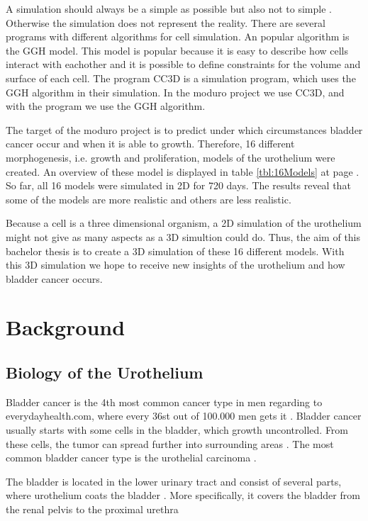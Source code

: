 A simulation should always be a simple as possible but also not to simple \cite{REF}. Otherwise the simulation does not represent the reality. 
There are several programs with different algorithms for cell simulation. An popular algorithm is the \ac{GGH} model. This model is popular because it is easy to describe how cells interact with eachother and it is possible to define constraints for the volume and surface of each cell. \newline
The program \ac{CC3D} is a simulation program, which uses the \ac{GGH} algorithm in their simulation. In the moduro project we use \ac{CC3D}, and with the program we use the \ac{GGH} algorithm.

The target of the moduro project is to predict under which circumstances bladder cancer occur and when it is able to growth. Therefore, 16 different morphogenesis, i.e. growth and proliferation, models of the urothelium were created. An overview of these model is displayed in table \ref{tbl:16Models} at page \pageref{tbl:16Models}. So far, all 16 models were simulated in 2D for 720 days. The results reveal that some of the models are more realistic and others are less realistic.

Because a cell is a three dimensional organism, a 2D simulation of the urothelium might not give as many aspects as a 3D simultion could do. Thus, the aim of this bachelor thesis is to create a 3D simulation of these 16 different models. With this 3D simulation we hope to receive new insights of the urothelium and how bladder cancer occurs.

\section{Background}
\subsection{Biology of the Urothelium}
Bladder cancer is the 4th most common cancer type in men regarding to everydayhealth.com, where every 36st out of 100.000 men gets it \cite{EveryDayHealth.com}. Bladder cancer usually starts with some cells in the bladder, which growth uncontrolled. From these cells, the tumor can spread further into surrounding areas \cite{Cancer.org}. The most common bladder cancer type is the urothelial carcinoma \cite{Cancer.org}.

The bladder is located in the lower urinary tract and consist of several parts, where urothelium coats the bladder \cite{Lazzeri2006}. More specifically, it covers the bladder from the renal pelvis to the proximal urethra \cite{Yamany2014, Birder2005} 

